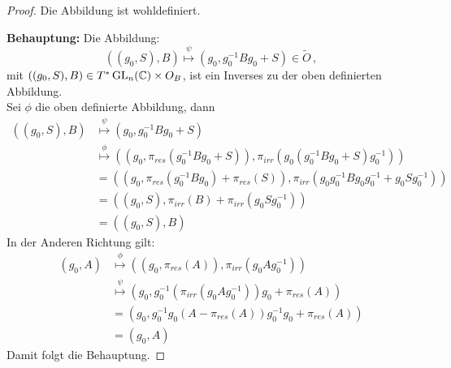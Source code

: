 \begin{proof}
Die Abbildung ist wohldefiniert.
\begin{comment}
denn???
\end{comment}
\textbf{Behauptung:} Die Abbildung:
\[
((g_0,S),B)\overset\psi\mapsto(g_0,g_0^{-1}Bg_0+S)\in\tilde O \,,
\]
mit $((g_0,S),B)\in T^*\operatorname{GL}_n(\mathbb{C})\times O_B$, ist ein Inverses zu der oben
definierten Abbildung.\\
Sei $\phi$ die oben definierte Abbildung, dann
\begin{align*}
((g_0,S),B)&\overset\psi\mapsto(g_0,g_0^{-1}Bg_0+S)
\\&\overset\phi\mapsto((g_0,\pi_{res}(g_0^{-1}Bg_0+S)),
    \pi_{irr}(g_0(g_0^{-1}Bg_0+S)g_0^{-1}))
\\&=((g_0,\pi_{res}(g_0^{-1}Bg_0)+\pi_{res}(S)),
    \pi_{irr}(g_0g_0^{-1}Bg_0g_0^{-1}+g_0Sg_0^{-1}))
\\&=((g_0,S), \pi_{irr}(B)+ \pi_{irr}(g_0Sg_0^{-1}))
\\&=((g_0,S), B)
\end{align*}
In der Anderen Richtung gilt:
\begin{align*}
(g_0,A)&\overset\phi\mapsto ((g_0,\pi_{res}(A)),\pi_{irr}(g_0Ag_0^{-1}))
\\&\overset\psi\mapsto (g_0,g_0^{-1}(\pi_{irr}(g_0Ag_0^{-1}))g_0+\pi_{res}(A))
\\&= (g_0,g_0^{-1}g_0(A - \pi_{res}(A))g_0^{-1}g_0+\pi_{res}(A))
\\&= (g_0,A)
\end{align*}
Damit folgt die Behauptung.
\end{proof}

